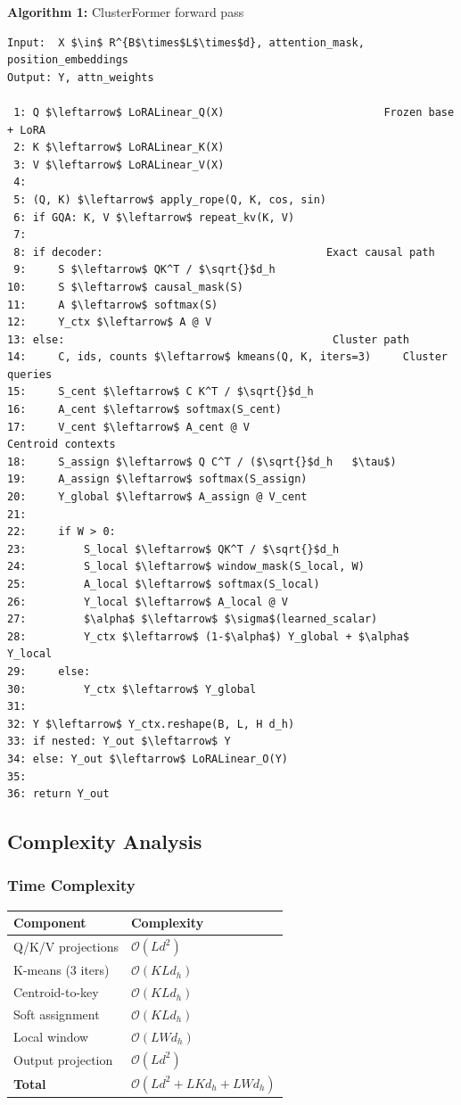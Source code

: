 \textbf{Algorithm 1:} ClusterFormer forward pass
\begin{lstlisting}
Input:  X $\in$ R^{B$\times$L$\times$d}, attention_mask, position_embeddings
Output: Y, attn_weights

 1: Q $\leftarrow$ LoRALinear_Q(X)                         Frozen base + LoRA
 2: K $\leftarrow$ LoRALinear_K(X)
 3: V $\leftarrow$ LoRALinear_V(X)
 4:
 5: (Q, K) $\leftarrow$ apply_rope(Q, K, cos, sin)
 6: if GQA: K, V $\leftarrow$ repeat_kv(K, V)
 7:
 8: if decoder:                                   Exact causal path
 9:     S $\leftarrow$ QK^T / $\sqrt{}$d_h
10:     S $\leftarrow$ causal_mask(S)
11:     A $\leftarrow$ softmax(S)
12:     Y_ctx $\leftarrow$ A @ V
13: else:                                          Cluster path
14:     C, ids, counts $\leftarrow$ kmeans(Q, K, iters=3)     Cluster queries
15:     S_cent $\leftarrow$ C K^T / $\sqrt{}$d_h
16:     A_cent $\leftarrow$ softmax(S_cent)
17:     V_cent $\leftarrow$ A_cent @ V                         Centroid contexts
18:     S_assign $\leftarrow$ Q C^T / ($\sqrt{}$d_h   $\tau$)
19:     A_assign $\leftarrow$ softmax(S_assign)
20:     Y_global $\leftarrow$ A_assign @ V_cent
21:
22:     if W > 0:
23:         S_local $\leftarrow$ QK^T / $\sqrt{}$d_h
24:         S_local $\leftarrow$ window_mask(S_local, W)
25:         A_local $\leftarrow$ softmax(S_local)
26:         Y_local $\leftarrow$ A_local @ V
27:         $\alpha$ $\leftarrow$ $\sigma$(learned_scalar)
28:         Y_ctx $\leftarrow$ (1-$\alpha$) Y_global + $\alpha$ Y_local
29:     else:
30:         Y_ctx $\leftarrow$ Y_global
31:
32: Y $\leftarrow$ Y_ctx.reshape(B, L, H d_h)
33: if nested: Y_out $\leftarrow$ Y
34: else: Y_out $\leftarrow$ LoRALinear_O(Y)
35:
36: return Y_out
\end{lstlisting}

\subsection{Complexity Analysis}

\subsubsection{Time Complexity}

\begin{table}[H]
\centering
\small
\begin{tabular}{ll}
\toprule
\textbf{Component} & \textbf{Complexity} \\
\midrule
Q/K/V projections & $\mathcal{O}(L d^2)$ \\
K-means (3 iters) & $\mathcal{O}(K L d_h)$ \\
Centroid-to-key & $\mathcal{O}(K L d_h)$ \\
Soft assignment & $\mathcal{O}(K L d_h)$ \\
Local window & $\mathcal{O}(L W d_h)$ \\
Output projection & $\mathcal{O}(L d^2)$ \\
\textbf{Total} & $\mathcal{O}(L d^2 + L K d_h + L W d_h)$ \\
\bottomrule
\end{tabular}
\end{table}

